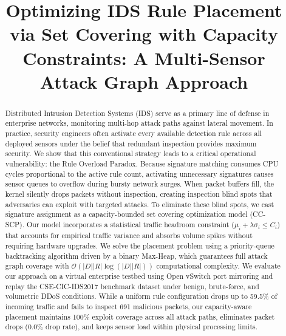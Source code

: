 \documentclass[conference]{IEEEtran}
\begin{document}
\title{Optimizing IDS Rule Placement via Set Covering with Capacity Constraints: A Multi-Sensor Attack Graph Approach}

\author{
}

\maketitle

\begin{abstract}
Distributed Intrusion Detection Systems (IDS) serve as a primary line of defense in enterprise networks, monitoring multi-hop attack paths against lateral movement. In practice, security engineers often activate every available detection rule across all deployed sensors under the belief that redundant inspection provides maximum security. We show that this conventional strategy leads to a critical operational vulnerability: the Rule Overload Paradox. Because signature matching consumes CPU cycles proportional to the active rule count, activating unnecessary signatures causes sensor queues to overflow during bursty network surges. When packet buffers fill, the kernel silently drops packets without inspection, creating inspection blind spots that adversaries can exploit with targeted attacks. To eliminate these blind spots, we cast signature assignment as a capacity-bounded set covering optimization model (CC-SCP). Our model incorporates a statistical traffic headroom constraint ($\mu_i + \lambda\sigma_i \le C_i$) that accounts for empirical traffic variance and absorbs volume spikes without requiring hardware upgrades. We solve the placement problem using a priority-queue backtracking algorithm driven by a binary Max-Heap, which guarantees full attack graph coverage with $\mathcal{O}(|D||R|\log(|D||R|))$ computational complexity. We evaluate our approach on a virtual enterprise testbed using Open vSwitch port mirroring and replay the CSE-CIC-IDS2017 benchmark dataset under benign, brute-force, and volumetric DDoS conditions. While a uniform rule configuration drops up to 59.5\% of incoming traffic and fails to inspect 691 malicious packets, our capacity-aware placement maintains 100\% exploit coverage across all attack paths, eliminates packet drops (0.0\% drop rate), and keeps sensor load within physical processing limits.
\end{abstract}
\end{document}
